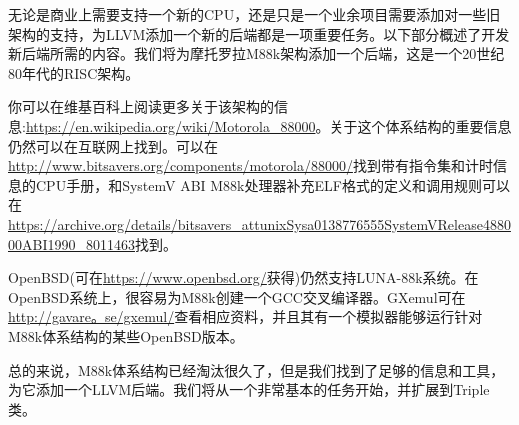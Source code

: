 无论是商业上需要支持一个新的CPU，还是只是一个业余项目需要添加对一些旧架构的支持，为LLVM添加一个新的后端都是一项重要任务。以下部分概述了开发新后端所需的内容。我们将为摩托罗拉M88k架构添加一个后端，这是一个20世纪80年代的RISC架构。\par

\begin{tcolorbox}[colback=blue!5!white,colframe=blue!75!black, title=References]
\hspace*{0.7cm}你可以在维基百科上阅读更多关于该架构的信息:\url{https://en.wikipedia.org/wiki/Motorola_88000}。关于这个体系结构的重要信息仍然可以在互联网上找到。可以在\url{http://www.bitsavers.org/components/motorola/88000/}找到带有指令集和计时信息的CPU手册，和SystemV ABI M88k处理器补充ELF格式的定义和调用规则可以在\url{https://archive.org/details/bitsavers_attunixSysa0138776555SystemVRelease488000ABI1990_8011463}找到。\par

\hspace*{0.7cm}OpenBSD(可在\url{https://www.openbsd.org/}获得)仍然支持LUNA-88k系统。在OpenBSD系统上，很容易为M88k创建一个GCC交叉编译器。GXemul可在\url{http://gavare。se/gxemul/}查看相应资料，并且其有一个模拟器能够运行针对M88k体系结构的某些OpenBSD版本。
\end{tcolorbox}

总的来说，M88k体系结构已经淘汰很久了，但是我们找到了足够的信息和工具，为它添加一个LLVM后端。我们将从一个非常基本的任务开始，并扩展到Triple类。\par




















































